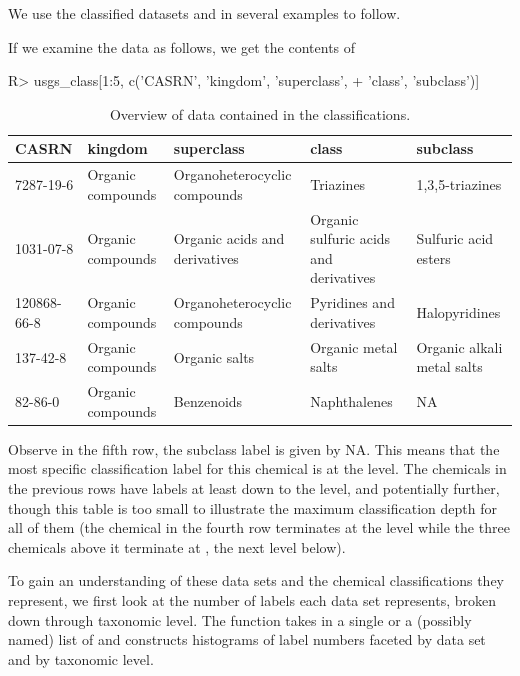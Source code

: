 \documentclass[article]{jss}
\newcommand{\fct}[1]{\code{#1()}}
\begin{document}
We use the classified datasets  and  in several examples to follow.

If we examine the  data as follows, we get the contents of
%
\begin{Schunk}
\begin{Sinput}
R> usgs_class[1:5, c('CASRN', 'kingdom', 'superclass',
+                              'class', 'subclass')]
\end{Sinput}
\end{Schunk}
%

\begin{table}[t!]
\scriptsize
\centering
\begin{tabular}{llllp{1.8cm}}
\hline

CASRN &	kingdom &	superclass & class & subclass\\
\hline
7287-19-6 & Organic compounds	& Organoheterocyclic compounds &	Triazines	& 1,3,5-triazines	 \\
1031-07-8 &	Organic compounds &	Organic acids and derivatives &	Organic sulfuric acids and derivatives &	Sulfuric acid esters  \\
120868-66-8	& Organic compounds &	Organoheterocyclic compounds &	Pyridines and derivatives &	Halopyridines	\\
137-42-8	& Organic compounds	& Organic salts	& Organic metal salts	& Organic alkali metal salts	\\
82-86-0	& Organic compounds & Benzenoids	& Naphthalenes &	NA	\\
\hline

\end{tabular}
\caption{\label{tab:usgs-head} Overview of data contained in the  classifications.}
\end{table}


Observe in the fifth row, the subclass label is given by NA. This means that the most specific classification label for this chemical is  at the  level. The chemicals in the previous rows have labels at least down to the  level, and potentially further, though this table is too small to illustrate the maximum classification depth for all of them (the chemical in the fourth row terminates at the  level while the three chemicals above it terminate at , the next level below).

To gain an understanding of these data sets and the chemical classifications they represent, we first look at the number of labels each data set represents, broken down through taxonomic level. The function \fct{label\_bars} takes in a single  or a (possibly named) list of  and constructs histograms of label numbers faceted by data set and by taxonomic level.
\end{document}
